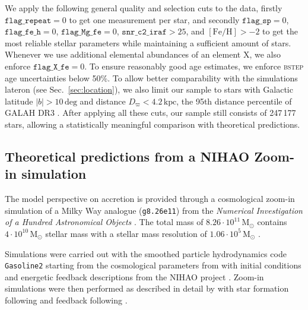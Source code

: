 \documentclass[fleqn,usenatbib]{mnras}
\begin{document}
We apply the following general quality and selection cuts to the data, firstly $\texttt{flag\_repeat} = 0$ to get one measurement per star, and secondly $\texttt{flag\_sp} = 0$, $\texttt{flag\_fe\_h} = 0$, $\texttt{flag\_Mg\_fe} = 0$, $\texttt{snr\_c2\_iraf} > 25$, and $\mathrm{[Fe/H]} > -2$ to get the most reliable stellar parameters while maintaining a sufficient amount of stars. Whenever we use additional elemental abundances of an element X, we also enforce $\texttt{flag\_X\_fe} = 0$. To ensure reasonably good age estimates, we enforce \textsc{bstep} age uncertainties below 50\%. To allow better comparability with the simulations lateron (see Sec.~\ref{sec:location}), we also limit our sample to stars with Galactic latitude $\vert b \vert > 10\,\mathrm{deg}$ and distance $D_\varpi < 4.2\,\mathrm{kpc}$, the 95th distance percentile of GALAH DR3 \citep{Buder2021}. After applying all these cuts, our sample still consists of 247\,177 stars, allowing a statistically meaningful comparison with theoretical predictions.

\subsection{Theoretical predictions from a NIHAO Zoom-in simulation}\label{sec:sim_data}

The model perspective on accretion is provided through a cosmological zoom-in simulation of a Milky Way analogue (\texttt{g8.26e11}) from the \textit{Numerical Investigation of a Hundred Astronomical Objects} \citep[NIHAO,][]{Wang2015}. The total mass of $8.26 \cdot 10^{11}\,\mathrm{M_\odot}$ contains $4 \cdot 10^{10}\,\mathrm{M_\odot}$ stellar mass with a stellar mass resolution of $1.06 \cdot 10^{5}\,\mathrm{M_\odot}$ \citep{Buck2021}.

Simulations were carried out with the smoothed particle hydrodynamics code \texttt{Gasoline2} \citep{Wadsley2017} starting from the cosmological parameters from \citet{Planck2014} with initial conditions and energetic feedback descriptions from the NIHAO project \citep{Wang2015}. Zoom-in simulations were then performed as described in detail by \citet{Buck2021} with star formation following \citet{Stinson2006} and feedback following \citet{Stinson2013}.
\end{document}

